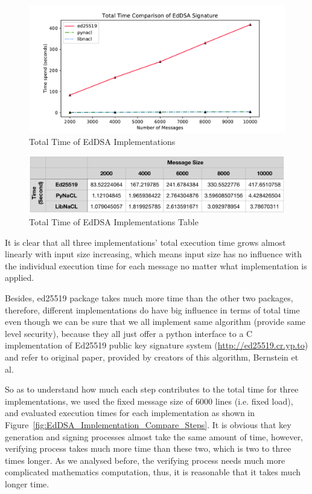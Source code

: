 \documentclass[10pt,sigconf]{acmart}
\begin{document}
\begin{figure}
\centering
\includegraphics[scale=0.45]{EdDSA_Implementation_Compare_Total}
\caption{\small{Total Time of EdDSA Implementations}}
\label{fig:EdDSA_Implementation_Compare_Total}
\end{figure}

\begin{figure}
\centering
\includegraphics[scale=0.4]{EdDSA_Implementation_Compare_Total_Table}
\caption{\small{Total Time of EdDSA Implementations Table}}
\label{fig:EdDSA_Implementation_Compare_Total_Table}
\end{figure}

It is clear that all three implementations' total execution time grows almost linearly with input size increasing, which means input size has no influence with the individual execution time for each message no matter what implementation is applied.

Besides, ed25519 package takes much more time than the other two packages, therefore, different implementations do have big influence in terms of total time even though we can be sure that we all implement same algorithm (provide same level security), because they all just offer a python interface to a C implementation of Ed25519 public key signature system (\url {http://ed25519.cr.yp.to}) and refer to original paper\cite{Bernstein2012}, provided by creators of this algorithm, Bernstein et al. 

So as to understand how much each step contributes to the total time for three implementations, we used the fixed message size of 6000 lines (i.e. fixed load), and evaluated execution times for each implementation as shown in Figure~\ref{fig:EdDSA_Implementation_Compare_Steps}. It is obvious that key generation and signing processes almost take the same amount of time, however, verifying process takes much more time than these two, which is two to three times longer. As we analysed before, the verifying process needs much more complicated mathematics computation, thus, it is reasonable that it takes much longer time.
\end{document}
